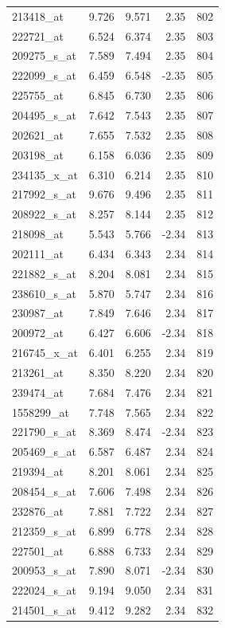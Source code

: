 \begin{footnotesize}
\begin{longtable}{lrrrr}
213418\_at & 9.726 & 9.571 & 2.35 & 802 \\
222721\_at & 6.524 & 6.374 & 2.35 & 803 \\
209275\_s\_at & 7.589 & 7.494 & 2.35 & 804 \\
222099\_s\_at & 6.459 & 6.548 & -2.35 & 805 \\
225755\_at & 6.845 & 6.730 & 2.35 & 806 \\
204495\_s\_at & 7.642 & 7.543 & 2.35 & 807 \\
202621\_at & 7.655 & 7.532 & 2.35 & 808 \\
203198\_at & 6.158 & 6.036 & 2.35 & 809 \\
234135\_x\_at & 6.310 & 6.214 & 2.35 & 810 \\
217992\_s\_at & 9.676 & 9.496 & 2.35 & 811 \\
208922\_s\_at & 8.257 & 8.144 & 2.35 & 812 \\
218098\_at & 5.543 & 5.766 & -2.34 & 813 \\
202111\_at & 6.434 & 6.343 & 2.34 & 814 \\
221882\_s\_at & 8.204 & 8.081 & 2.34 & 815 \\
238610\_s\_at & 5.870 & 5.747 & 2.34 & 816 \\
230987\_at & 7.849 & 7.646 & 2.34 & 817 \\
200972\_at & 6.427 & 6.606 & -2.34 & 818 \\
216745\_x\_at & 6.401 & 6.255 & 2.34 & 819 \\
213261\_at & 8.350 & 8.220 & 2.34 & 820 \\
239474\_at & 7.684 & 7.476 & 2.34 & 821 \\
1558299\_at & 7.748 & 7.565 & 2.34 & 822 \\
221790\_s\_at & 8.369 & 8.474 & -2.34 & 823 \\
205469\_s\_at & 6.587 & 6.487 & 2.34 & 824 \\
219394\_at & 8.201 & 8.061 & 2.34 & 825 \\
208454\_s\_at & 7.606 & 7.498 & 2.34 & 826 \\
232876\_at & 7.881 & 7.722 & 2.34 & 827 \\
212359\_s\_at & 6.899 & 6.778 & 2.34 & 828 \\
227501\_at & 6.888 & 6.733 & 2.34 & 829 \\
200953\_s\_at & 7.890 & 8.071 & -2.34 & 830 \\
222024\_s\_at & 9.194 & 9.050 & 2.34 & 831 \\
214501\_s\_at & 9.412 & 9.282 & 2.34 & 832 \\

\end{longtable}
\end{footnotesize}
